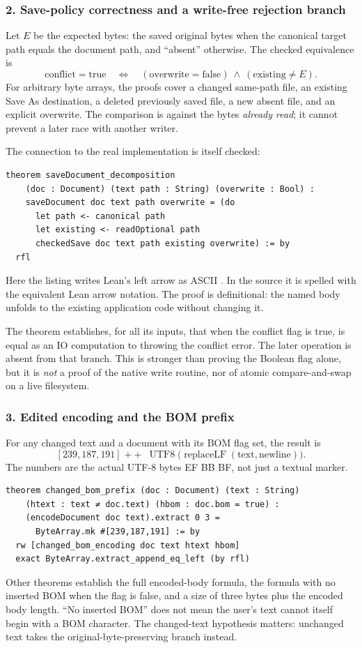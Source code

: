 \documentclass[11pt,letterpaper]{article}
\newcommand{\code}[1]{\texttt{\detokenize{#1}}}
\begin{document}
\subsubsection*{2. Save-policy correctness and a write-free rejection branch}
Let $E$ be the expected bytes: the saved original bytes when the canonical target
path equals the document path, and ``absent'' otherwise. The checked equivalence is
\[
  \text{conflict} = \text{true}
  \quad\Longleftrightarrow\quad
  (\text{overwrite} = \text{false})\ \land\ (\text{existing} \ne E).
\]
For arbitrary byte arrays, the proofs cover a changed same-path file, an existing
Save As destination, a deleted previously saved file, a new absent file, and an
explicit overwrite. The comparison is against the bytes \emph{already read}; it
cannot prevent a later race with another writer.

The connection to the real implementation is itself checked:
\begin{lstlisting}
theorem saveDocument_decomposition
    (doc : Document) (text path : String) (overwrite : Bool) :
    saveDocument doc text path overwrite = (do
      let path <- canonical path
      let existing <- readOptional path
      checkedSave doc text path existing overwrite) := by
  rfl
\end{lstlisting}
Here the listing writes Lean's left arrow as ASCII \code{<-}. In the source it is
spelled with the equivalent Lean arrow notation. The proof is definitional: the
named body unfolds to the existing application code without changing it.

The theorem \code{rejected_save_is_error} establishes, for all its inputs, that
when the conflict flag is true, \code{checkedSave} is equal as an IO computation
to throwing the conflict error. The later \code{atomicWrite} operation is absent
from that branch. This is stronger than proving the Boolean flag alone, but it is
\emph{not} a proof of the native write routine, nor of atomic compare-and-swap on
a live filesystem.

\subsubsection*{3. Edited encoding and the BOM prefix}
For any changed text and a document with its BOM flag set, the result is
\[
  [239,187,191]\;{+\!+}\;
  \operatorname{UTF8}\bigl(\operatorname{replaceLF}(\text{text},\text{newline})\bigr).
\]
The numbers are the actual UTF-8 bytes EF BB BF, not just a textual marker.
\begin{lstlisting}
theorem changed_bom_prefix (doc : Document) (text : String)
    (htext : text ≠ doc.text) (hbom : doc.bom = true) :
    (encodeDocument doc text).extract 0 3 =
      ByteArray.mk #[239,187,191] := by
  rw [changed_bom_encoding doc text htext hbom]
  exact ByteArray.extract_append_eq_left (by rfl)
\end{lstlisting}
Other theorems establish the full encoded-body formula, the formula with no
inserted BOM when the flag is false, and a size of three bytes plus the encoded
body length. ``No inserted BOM'' does not mean the user's text cannot itself
begin with a BOM character. The changed-text hypothesis matters: unchanged text
takes the original-byte-preserving branch instead.
\end{document}
